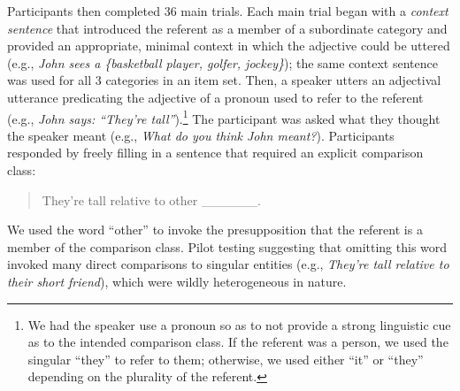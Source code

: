 \documentclass[doc, floatsintext]{apa6}
\begin{document}

Participants then completed 36 main trials. Each main trial began with a \emph{context sentence} that introduced the referent as a member of a subordinate category and provided an appropriate, minimal context in which the adjective could be uttered (e.g., \emph{John sees a \{basketball player, golfer, jockey\}}); the same context sentence was used for all 3 categories in an item set.
Then, a speaker utters an adjectival utterance predicating the adjective of a pronoun used to refer to the referent (e.g., \emph{John says: ``They're tall''}).\footnote{
We had the speaker use a pronoun so as to not provide a strong linguistic cue as to the intended comparison class. If the referent was a person, we used  the singular ``they'' to refer to them; otherwise, we used either ``it'' or ``they'' depending on the plurality of the referent.
}
The participant was asked what they thought the speaker meant (e.g., \emph{What do you think John meant?}). Participants responded by freely filling in a sentence that required an explicit comparison class:
\begin{quote}
They're tall relative to other \_\_\_\_\_\_.
\end{quote}
We used the word ``other'' to invoke the presupposition that the referent is a member of the comparison class. Pilot testing suggesting that omitting this word invoked many direct comparisons to singular entities (e.g., \emph{They're tall relative to their short friend}), which were wildly heterogeneous in nature.

\end{document}
